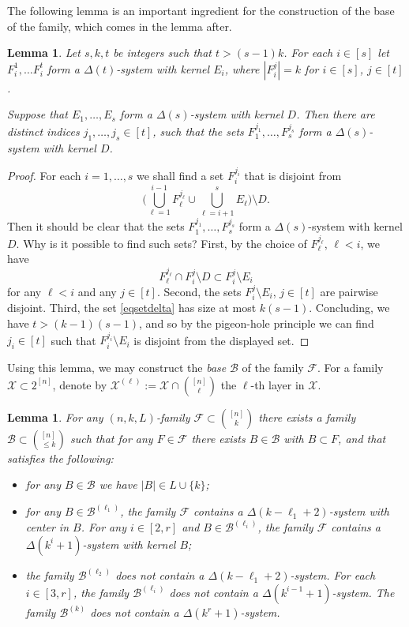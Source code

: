 \documentclass[graybox]{svmult}
\renewcommand{\le}{\leqslant}
\newcommand{\ff}{\mathcal{F}}
\newcommand{\m}{\mathcal}
\newtheorem{lem}[thm]{Lemma}
\begin{document}
The following lemma is an important ingredient for the construction of the base of the family, which comes in the lemma after.
\begin{lem}\label{lemdeltadef}
  Let $s,k,t$ be integers such that $t>(s-1)k$. For each $i\in [s]$ let $F_i^1,\ldots F_i^t$ form a $\Delta(t)$-system with kernel $E_i$, where $|F_i^j| = k$ for $i\in[s]$, $j\in[t]$.

  Suppose that $E_1,\ldots, E_s$ form a $\Delta(s)$-system with kernel $D$. Then there are distinct indices $j_1,\ldots, j_s\in[t]$, such that the sets $F_1^{j_1},\ldots, F_s^{j_s}$ form a $\Delta(s)$-system with kernel $D$.
\end{lem}
\begin{proof}
  For each $i=1,\ldots, s$ we shall find a set $F^{j_i}_i$ that is disjoint from \begin{equation}\label{eqsetdelta}\Big(\bigcup_{\ell=1}^{i-1}F^{j_\ell}_\ell \cup\bigcup_{\ell=i+1}^s E_\ell\Big)\setminus D.\end{equation}
 Then it should be clear that the sets  $F_1^{j_1},\ldots, F_s^{j_s}$ form a $\Delta(s)$-system with kernel $D$. Why is it possible to find such sets? First, by the choice of $F_{\ell}^{j_\ell}$, $\ell<i$, we have $$F_{\ell}^{j_\ell}\cap F_i^j\setminus D\subset F_i^j\setminus E_i$$   for any $\ell<i$ and any $j\in [t]$.  Second, the sets  $F_i^j\setminus E_i$, $j\in[t]$ are pairwise disjoint. Third, the set \eqref{eqsetdelta} has size at most $k(s-1)$. %
 Concluding, we have $t>(k-1)(s-1)$, and so by the pigeon-hole principle we can find $j_i\in[t]$ such that $F_i^{j_i}\setminus E_i$ is disjoint from the displayed set.
\end{proof}
Using this lemma, we may construct the {\em base} $\m B$ of the family $\ff$. For a family $\m X\subset 2^{[n]}$, denote by $\m X^{(\ell)}:=\m X\cap {[n]\choose \ell}$ the $\ell$-th layer in $\m X$.
\begin{lem}\label{lemdeltabase}
  For any $(n,k,L)$-family $\ff\subset {[n]\choose k}$ there exists a family $\m B\subset {[n]\choose \le k}$ such that for any $F\in \m F$ there exists $B\in \m B$ with $B\subset F$, and that satisfies the following:
  \begin{itemize}
  \item[(i)] for any $B\in \m B$ we have $|B|\in L\cup \{k\}$;
  \item[(ii)] for any $B\in \m B^{(\ell_1)}$, the family $\ff$ contains a $\Delta(k-\ell_1+2)$-system with center in $B$. For any $i\in [2,r]$ and $B\in \m B^{(\ell_i)}$, the family $\ff$ contains a $\Delta(k^i+1)$-system with kernel $B$;
  \item[(iii)] the family $\m B^{(\ell_2)}$ does not contain a $\Delta(k-\ell_1+2)$-system. For each $i\in [3,r]$, the family  $\m B^{(\ell_i)}$ does not contain a $\Delta(k^{i-1}+1)$-system. The family $\m B^{(k)}$ does not contain a $\Delta(k^r+1)$-system.
  \end{itemize}
\end{lem}
\end{document}
